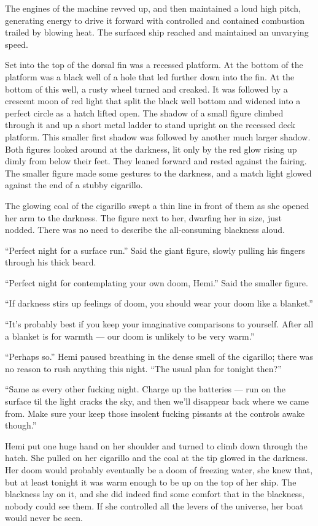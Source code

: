 \documentclass[]{article}
\begin{document}
\begin{multicols}{2}
The engines of the machine revved up, and then maintained a loud high
pitch, generating energy to drive it forward with controlled and
contained combustion trailed by blowing heat. The surfaced ship reached
and maintained an unvarying speed.

Set into the top of the dorsal fin was a recessed platform. At the
bottom of the platform was a black well of a hole that led further down
into the fin. At the bottom of this well, a rusty wheel turned and
creaked. It was followed by a crescent moon of red light that split the
black well bottom and widened into a perfect circle as a hatch lifted
open. The shadow of a small figure climbed through it and up a short
metal ladder to stand upright on the recessed deck platform. This
smaller first shadow was followed by another much larger shadow. Both
figures looked around at the darkness, lit only by the red glow rising
up dimly from below their feet. They leaned forward and rested against
the fairing. The smaller figure made some gestures to the darkness, and
a match light glowed against the end of a stubby cigarillo.

The glowing coal of the cigarillo swept a thin line in front of them as
she opened her arm to the darkness. The figure next to her, dwarfing her
in size, just nodded. There was no need to describe the all-consuming
blackness aloud.

``Perfect night for a surface run.'' Said the giant figure, slowly
pulling his fingers through his thick beard.

``Perfect night for contemplating your own doom, Hemi.'' Said the
smaller figure.

``If darkness stirs up feelings of doom, you should wear your doom like
a blanket.''

``It's probably best if you keep your imaginative comparisons to
yourself. After all a blanket is for warmth --- our doom is unlikely to
be very warm.''

``Perhaps so.'' Hemi paused breathing in the dense smell of the
cigarillo; there was no reason to rush anything this night. ``The usual
plan for tonight then?''

``Same as every other fucking night. Charge up the batteries --- run on
the surface til the light cracks the sky, and then we'll disappear back
where we came from. Make sure your keep those insolent fucking pissants
at the controls awake though.''

Hemi put one huge hand on her shoulder and turned to climb down through
the hatch. She pulled on her cigarillo and the coal at the tip glowed in
the darkness. Her doom would probably eventually be a doom of freezing
water, she knew that, but at least tonight it was warm enough to be up
on the top of her ship. The blackness lay on it, and she did indeed find
some comfort that in the blackness, nobody could see them. If she
controlled all the levers of the universe, her boat would never be seen.


\end{multicols}
\end{document}
